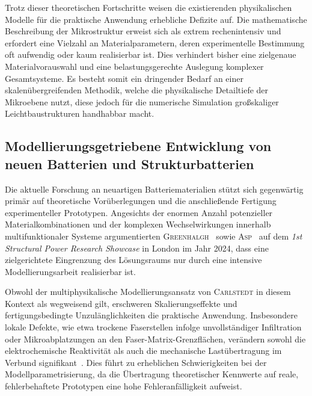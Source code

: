 Trotz dieser theoretischen Fortschritte weisen die existierenden physikalischen Modelle für die praktische Anwendung erhebliche Defizite auf. Die mathematische Beschreibung der Mikrostruktur erweist sich als extrem rechenintensiv und erfordert eine Vielzahl an Materialparametern, deren experimentelle Bestimmung oft aufwendig oder kaum realisierbar ist. Dies verhindert bisher eine zielgenaue Materialvorauswahl und eine belastungsgerechte Auslegung komplexer Gesamtsysteme. Es besteht somit ein dringender Bedarf an einer skalenübergreifenden Methodik, welche die physikalische Detailtiefe der Mikroebene nutzt, diese jedoch für die numerische Simulation großskaliger Leichtbaustrukturen handhabbar macht.

\subsection*{Modellierungsgetriebene Entwicklung von neuen Batterien und Strukturbatterien}

Die aktuelle Forschung an neuartigen Batteriematerialien stützt sich gegenwärtig primär auf theoretische Vorüberlegungen und die anschließende Fertigung experimenteller Prototypen. Angesichts der enormen Anzahl potenzieller Materialkombinationen und der komplexen Wechselwirkungen innerhalb multifunktionaler Systeme argumentierten \textsc{Greenhalgh}~\cite{Greenhalgh2024, Greenhalgh2024a} sowie \textsc{Asp}~\cite{Asp2024} auf dem \textit{1st Structural Power Research Showcase} in London im Jahr 2024, dass eine zielgerichtete Eingrenzung des Lösungsraums nur durch eine intensive Modellierungsarbeit realisierbar ist.


Obwohl der multiphysikalische Modellierungsansatz von \textsc{Carlstedt} in diesem Kontext als wegweisend gilt, erschweren Skalierungseffekte und fertigungsbedingte Unzulänglichkeiten die praktische Anwendung. Insbesondere lokale Defekte, wie etwa trockene Faserstellen infolge unvollständiger Infiltration oder Mikroabplatzungen an den Faser-Matrix-Grenzflächen, verändern sowohl die elektrochemische Reaktivität als auch die mechanische Lastübertragung im Verbund signifikant~\cite{Franco2019, Fam2024}. Dies führt zu erheblichen Schwierigkeiten bei der Modellparametrisierung, da die Übertragung theoretischer Kennwerte auf reale, fehlerbehaftete Prototypen eine hohe Fehleranfälligkeit aufweist. 

